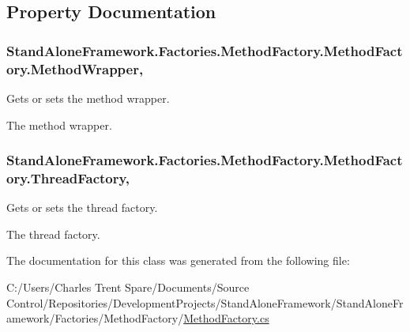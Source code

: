\subsection{Property Documentation}
\hypertarget{class_stand_alone_framework_1_1_factories_1_1_method_factory_1_1_method_factory_a1be5b47ac05d4e1fb9fbf29cc185019e}{
\subsubsection[{Method\+Wrapper}]{ Stand\+Alone\+Framework.\+Factories.\+Method\+Factory.\+Method\+Factory.\+Method\+Wrapper\hspace{0.3cm}{\ttfamily [get]}, {\ttfamily [set]}}}\label{class_stand_alone_framework_1_1_factories_1_1_method_factory_1_1_method_factory_a1be5b47ac05d4e1fb9fbf29cc185019e}


Gets or sets the method wrapper. 

The method wrapper.\hypertarget{class_stand_alone_framework_1_1_factories_1_1_method_factory_1_1_method_factory_a42dbb8efe86a1f9724b65097bcef9efd}{
\subsubsection[{Thread\+Factory}]{ Stand\+Alone\+Framework.\+Factories.\+Method\+Factory.\+Method\+Factory.\+Thread\+Factory\hspace{0.3cm}{\ttfamily [get]}, {\ttfamily [set]}}}\label{class_stand_alone_framework_1_1_factories_1_1_method_factory_1_1_method_factory_a42dbb8efe86a1f9724b65097bcef9efd}


Gets or sets the thread factory. 

The thread factory.

The documentation for this class was generated from the following file\+:\begin{DoxyCompactItemize}
\item 
C\+:/\+Users/\+Charles Trent Spare/\+Documents/\+Source Control/\+Repositories/\+Development\+Projects/\+Stand\+Alone\+Framework/\+Stand\+Alone\+Framework/\+Factories/\+Method\+Factory/\hyperlink{_method_factory_8cs}{Method\+Factory.\+cs}\end{DoxyCompactItemize}
